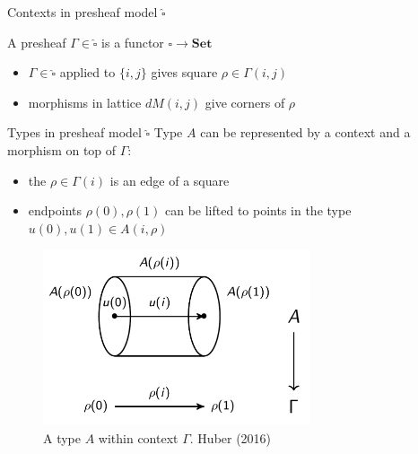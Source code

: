 \documentclass[english]{beamer}
\newcommand{\incfig}[1]{%
    \def\svgwidth{\columnwidth}
    {#1.pdf_tex}
}
\begin{document}
\begin{frame}{Contexts in presheaf model $\widehat{\square}$}
 

    \begin{example}
        A presheaf $\Gamma \in \widehat{\square}$ is a functor $\square \rightarrow \mathbf{Set}$

        \begin{itemize}
            \item $\Gamma \in \widehat{\square}$ applied to $\{i,j\}$ gives square $\rho \in \Gamma (i,j)$
            \item morphisms in lattice $dM(i,j)$ give corners of $\rho$

        \end{itemize}
        \begin{figure}
            
            
        \end{figure}
    \end{example}
 
\end{frame}

\begin{frame}{Types in presheaf model $\widehat{\square}$}
    Type $A$ can be represented by a context and a morphism on top of $\Gamma$:
    \begin{itemize}
        \item the $\rho \in \Gamma (i)$ is an edge of a square
        \item endpoints $\rho (0), \rho (1)$ can be lifted to points in the type $u(0),u(1) \in A(i,\rho)$
    \end{itemize}

 \begin{figure}
\centering
\includegraphics[width=0.7\textwidth]{figures/types}
\caption{A type $A$ within context $\Gamma$. Huber (2016)}
 \end{figure}
 
\end{frame}
\end{document}
